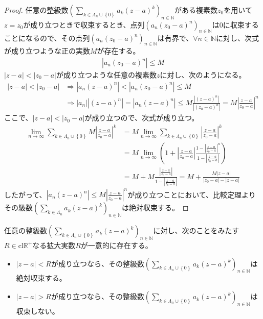 \documentclass[dvipdfmx]{jsarticle}
\begin{document}
\begin{proof}
任意の整級数$\left( \sum_{k \in \varLambda_{n} \cup \left\{ 0 \right\}} {a_{k}(z - a)^{k}} \right)_{n \in \mathbb{N}}$がある複素数$z_{0}$を用いて$z = z_{0}$が成り立つときで収束するとき、点列$\left( a_{n}\left( z_{0} - a \right)^{n} \right)_{n \in \mathbb{N}}$は$0$に収束することになるので、その点列$\left( a_{n}\left( z_{0} - a \right)^{n} \right)_{n \in \mathbb{N}}$は有界で、$\forall n \in \mathbb{N}$に対し、次式が成り立つような正の実数$M$が存在する。
\begin{align*}
\left| a_{n}\left( z_{0} - a \right)^{n} \right| \leq M
\end{align*}
$|z - a| < \left| z_{0} - a \right|$が成り立つような任意の複素数$z$に対し、次のようになる。
\begin{align*}
|z - a| < \left| z_{0} - a \right| &\Rightarrow \left| a_{n}(z - a)^{n} \right| < \left| a_{n}\left( z_{0} - a \right)^{n} \right| \leq M\\
&\Rightarrow \left| a_{n} \right|\left| (z - a)^{n} \right| = \left| a_{n}(z - a)^{n} \right| \leq M\frac{\left| (z - a)^{n} \right|}{\left| \left( z_{0} - a \right)^{n} \right|} = M\left| \frac{z - a}{z_{0} - a} \right|^{n}
\end{align*}
ここで、$|z - a| < \left| z_{0} - a \right|$が成り立つので、次式が成り立つ。
\begin{align*}
\lim_{n \rightarrow \infty}{\sum_{k \in \varLambda_{n} \cup \left\{ 0 \right\}} {M\left| \frac{z - a}{z_{0} - a} \right|^{k}}} &= M\lim_{n \rightarrow \infty}{\sum_{k \in \varLambda_{n} \cup \left\{ 0 \right\}} \left| \frac{z - a}{z_{0} - a} \right|^{k}}\\
&= M\lim_{n \rightarrow \infty}\left( 1 + \left| \frac{z - a}{z_{0} - a} \right|\frac{1 - \left| \frac{z - a}{z_{0} - a} \right|^{n}}{1 - \left| \frac{z - a}{z_{0} - a} \right|} \right)\\
&= M + M\frac{\left| \frac{z - a}{z_{0} - a} \right|}{1 - \left| \frac{z - a}{z_{0} - a} \right|} = M + \frac{M|z - a|}{\left| z_{0} - a \right| - |z - a|}
\end{align*}
したがって、$\left| a_{n}(z - a)^{n} \right| \leq M\left| \frac{z - a}{z_{0} - a} \right|^{n}$が成り立つことにおいて、比較定理よりその級数$\left( \sum_{k \in \varLambda_{n}} {a_{k}(z - a)^{k}} \right)_{n \in \mathbb{N}}$は絶対収束する。
\end{proof}
\begin{thm}\label{4.1.13.4}
任意の整級数$\left( \sum_{k \in \varLambda_{n} \cup \left\{ 0 \right\}} {a_{k}(z - a)^{k}} \right)_{n \in \mathbb{N}}$に対し、次のことをみたす$R \in \mathrm{cl}\mathbb{R}^{+}$なる拡大実数$R$が一意的に存在する。
\begin{itemize}
\item
  $|z - a| < R$が成り立つなら、その整級数$\left( \sum_{k \in \varLambda_{n} \cup \left\{ 0 \right\}} {a_{k}(z - a)^{k}} \right)_{n \in \mathbb{N}}$は絶対収束する。
\item
  $|z - a| > R$が成り立つなら、その整級数$\left( \sum_{k \in \varLambda_{n} \cup \left\{ 0 \right\}} {a_{k}(z - a)^{k}} \right)_{n \in \mathbb{N}}$は収束しない。
\end{itemize}
\end{thm}\par
\end{document}
